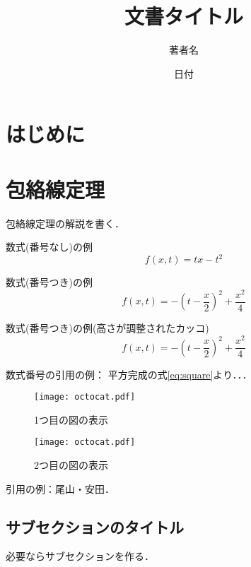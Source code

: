 \documentclass[11pt,a4j,fleqn]{jarticle}
\title{文書タイトル}
\author{著者名}
\date{日付}
\begin{document}
\maketitle

\section{はじめに}



\section{包絡線定理}

包絡線定理の解説を書く．

数式(番号なし)の例
\[
f(x, t) = t x - t^2
\]


数式(番号つき)の例
\begin{equation}
f(x, t)  = -(t - \frac{x}{2})^2 + \frac{x^2}{4} \label{eq:square}
\end{equation}

数式(番号つき)の例(高さが調整されたカッコ)
\begin{equation}
f(x, t) = -\left(t - \frac{x}{2}\right)^2 + \frac{x^2}{4} \label{eq:square-2}
\end{equation}



数式番号の引用の例：
平方完成の式\eqref{eq:square}より．．．

\begin{figure}
\begin{center}
\texttt{[image: octocat.pdf]}
\end{center}
\caption{1つ目の図の表示}
\label{fig:1}
\end{figure}

\begin{figure}
\begin{center}
\texttt{[image: octocat.pdf]}
\end{center}
\caption{2つ目の図の表示}
\label{fig:2}
\end{figure}



引用の例：尾山・安田\cite{OyamaYasuda11}．


\subsection{サブセクションのタイトル}

必要ならサブセクションを作る．
\end{document}
